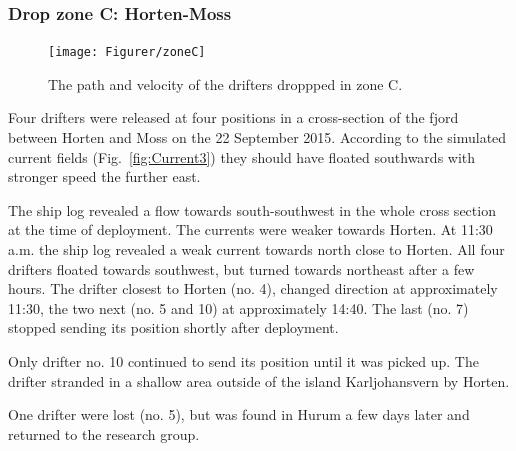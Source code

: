 \documentclass[12pt,a4paper,english]{article}
\begin{document}
\subsubsection{Drop zone C: Horten-Moss}
%
\begin{figure}[ht]
\centerline{
\texttt{[image: Figurer/zoneC]}}
\caption{\small
The path and velocity of the drifters droppped in zone C.}
\label{fig:ZoneC}
\end{figure}
%
%
Four drifters were released at four positions in a cross-section of the fjord between Horten and Moss on the 22 September 2015. According to the simulated current fields (Fig.~\ref{fig:Current3}) they should have floated southwards with stronger speed the further east. 

The ship log revealed a flow towards south-southwest in the whole cross section at the time of deployment. The currents were weaker towards Horten. At 11:30 a.m. the ship log revealed a weak current towards north close to Horten. All four drifters floated towards southwest, but turned towards northeast after a few hours. The drifter closest to Horten (no. 4), changed direction at approximately 11:30, the two next (no. 5 and 10) at approximately 14:40. The last (no. 7) stopped sending its position shortly after deployment.

Only drifter no. 10 continued to send its position until it was picked up. The drifter stranded in a shallow area outside of the island Karljohansvern by Horten.

One drifter were lost (no. 5), but was found in Hurum a few days later and returned to the research group.

\end{document}
